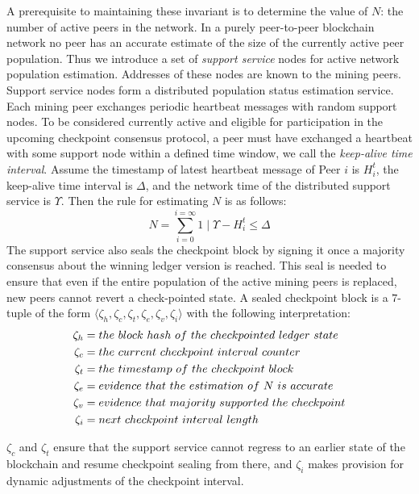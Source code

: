 \documentclass[conference]{IEEEtran}
\begin{document}
A prerequisite to maintaining these invariant is to determine the value of $N$: the number of active peers in the network. In a purely peer-to-peer blockchain network no peer has an accurate estimate of the size of the currently active peer population. Thus we introduce a set of \textit{support service} nodes for active network population estimation. Addresses of these nodes are known to the mining peers. Support service nodes form a distributed population status estimation service. Each mining peer exchanges periodic heartbeat messages with random support nodes. To be considered currently active and eligible for participation in the upcoming checkpoint consensus protocol, a peer must have exchanged a heartbeat with some support node within a defined time window, we call the \textit{keep-alive time interval}. Assume the timestamp of latest heartbeat message of Peer $i$ is $H_i^t$, the keep-alive time interval is $\Delta$, and the network time of the distributed support service is $\Upsilon$. Then the rule for estimating $N$ is as follows:  
\begin{equation}
\label{e-4}
N = \sum_{i = 0}^{i = \infty}{1 \mid \Upsilon - H_i^t \leq \Delta}
\end{equation}
The support service also seals the checkpoint block by signing it once a majority consensus about the winning ledger version is reached. This seal is needed to ensure that even if the entire population of the active mining peers is replaced, new peers cannot revert a check-pointed state. A sealed checkpoint block is a $7$-tuple of the form $\langle \zeta_h, \zeta_c, \zeta_t, \zeta_e, \zeta_v, \zeta_i \rangle$ with the following interpretation:
\begin{equation*}
\begin{split}
	\zeta_h & = the\ block\ hash\ of\ the\ check\-pointed\ ledger\ state \\
	\zeta_c & = the\ current\ checkpoint\ interval\ counter \\
	\zeta_t & = the\ timestamp\ of\ the\ checkpoint\ block \\
	\zeta_e & = evidence\ that\ the\ estimation\ of\ N\ is\ accurate \\
	\zeta_v & = evidence\ that\ majority\ supported\ the\ checkpoint \\
	\zeta_i & = next\ checkpoint\ interval\ length
\end{split}
\end{equation*}

$\zeta_c$ and $\zeta_t$ ensure that the support service cannot regress to an earlier state of the blockchain and resume checkpoint sealing from there, and $\zeta_i$ makes provision for dynamic adjustments of the checkpoint interval.
\end{document}
